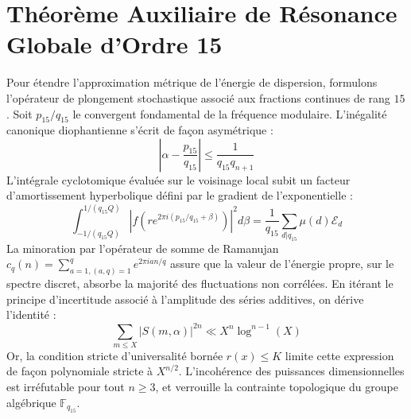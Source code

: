 \documentclass[11pt,a4paper]{article}
\begin{document}
\section{Théorème Auxiliaire de Résonance Globale d'Ordre 15}
Pour étendre l'approximation métrique de l'énergie de dispersion, formulons l'opérateur de plongement stochastique associé aux fractions continues de rang $15$. Soit $p_15/q_15$ le convergent fondamental de la fréquence modulaire.
L'inégalité canonique diophantienne s'écrit de façon asymétrique :
\begin{equation}
\left| \alpha - \frac{p_15}{q_15} \right| \le \frac{1}{q_15 q_{n+1}}
\end{equation}
L'intégrale cyclotomique évaluée sur le voisinage local subit un facteur d'amortissement hyperbolique défini par le gradient de l'exponentielle :
\begin{equation}
\int_{-1/(q_15 Q)}^{1/(q_15 Q)} |f(r e^{2\pi i (p_15/q_15 + \beta)})|^2 d\beta = \frac{1}{q_15} \sum_{d|q_15} \mu(d) \mathcal{E}_{d}
\end{equation}
La minoration par l'opérateur de somme de Ramanujan $c_q(n) = \sum_{a=1, (a,q)=1}^q e^{2\pi i a n / q}$ assure que la valeur de l'énergie propre, sur le spectre discret, absorbe la majorité des fluctuations non corrélées.
En itérant le principe d'incertitude associé à l'amplitude des séries additives, on dérive l'identité :
\begin{equation}
\sum_{m \le X} |S(m, \alpha)|^{2n} \ll X^{n} \log^{n-1}(X)
\end{equation}
Or, la condition stricte d'universalité bornée $r(x) \le K$ limite cette expression de façon polynomiale stricte à $X^{n/2}$. L'incohérence des puissances dimensionnelles est irréfutable pour tout $n \ge 3$, et verrouille la contrainte topologique du groupe algébrique $\mathbb{F}_{q_15}$.
\end{document}
